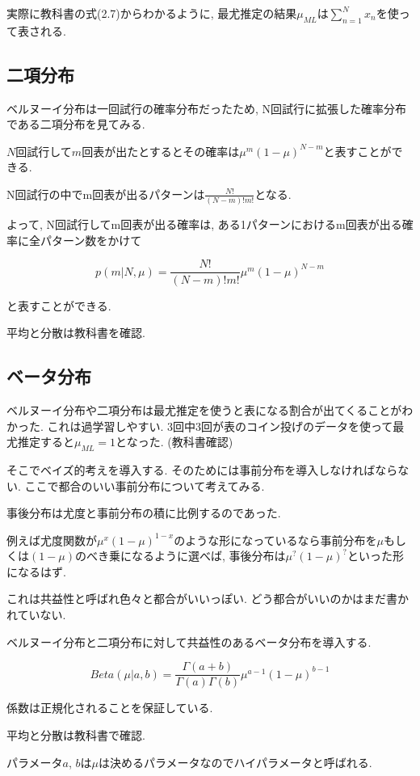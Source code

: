 実際に教科書の式(2.7)からわかるように, 最尤推定の結果$\mu_{ML}$は$\sum_{n=1}^{N} x_n$を使って表される.

\subsection{二項分布}

ベルヌーイ分布は一回試行の確率分布だったため, N回試行に拡張した確率分布である二項分布を見てみる.

$N$回試行して$m$回表が出たとするとその確率は$\mu^{m}(1-\mu)^{N-m}$と表すことができる. 

N回試行の中でm回表が出るパターンは$\frac{N!}{(N-m)!m!}$となる.

よって, N回試行してm回表が出る確率は, ある1パターンにおけるm回表が出る確率に全パターン数をかけて

$$p(m|N, \mu) = \frac{N!}{(N-m)!m!}\mu^{m}(1-\mu)^{N-m}$$

と表すことができる.

平均と分散は教科書を確認.

\subsection{ベータ分布}

ベルヌーイ分布や二項分布は最尤推定を使うと表になる割合が出てくることがわかった.
これは過学習しやすい. 3回中3回が表のコイン投げのデータを使って最尤推定すると$\mu_{ML}=1$となった. (教科書確認)

そこでベイズ的考えを導入する. そのためには事前分布を導入しなければならない. ここで都合のいい事前分布について考えてみる. 

事後分布は尤度と事前分布の積に比例するのであった.

例えば尤度関数が$\mu^x(1-\mu)^{1-x}$のような形になっているなら事前分布を$\mu$もしくは$(1-\mu)$のべき乗になるように選べば, 事後分布は$\mu^{?}(1-\mu)^{?}$といった形になるはず.

これは共益性と呼ばれ色々と都合がいいっぽい. どう都合がいいのかはまだ書かれていない.

ベルヌーイ分布と二項分布に対して共益性のあるベータ分布を導入する.

$$Beta(\mu|a, b) = \frac{\Gamma (a+b)}{\Gamma (a) \Gamma (b)}\mu^{a-1}(1-\mu)^{b-1} $$

係数は正規化されることを保証している.

平均と分散は教科書で確認.

パラメータ$a$, $b$は$\mu$は決めるパラメータなのでハイパラメータと呼ばれる.

